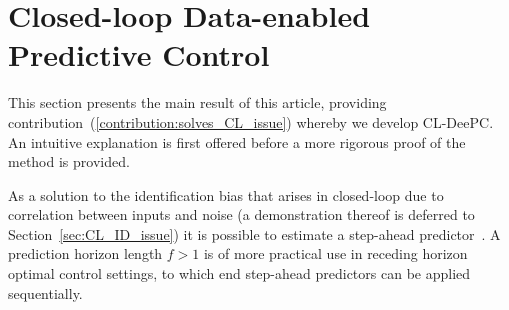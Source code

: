 \section{Closed-loop Data-enabled Predictive Control}
This section presents the main result of this article, providing contribution~(\ref{contribution:solves_CL_issue}) whereby we develop \ac{CL-DeePC}. An intuitive explanation is first offered before a more rigorous proof of the method is provided.

As a solution to the identification bias that arises in closed-loop due to correlation between inputs and noise (a demonstration thereof is deferred to Section~\ref{sec:CL_ID_issue}) it is possible to estimate a step-ahead predictor~\citep{Ljung1996}. A prediction horizon length $f>1$ is of more practical use in receding horizon optimal control settings, to which end step-ahead predictors can be applied sequentially. 

